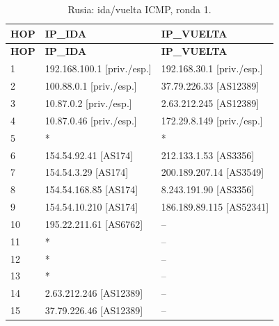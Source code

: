\begin{longtable}{p{0.95cm}p{7.075cm}p{7.075cm}}
\caption{Rusia: ida/vuelta ICMP, ronda 1.}\label{anexo:vuelta:37.79.226.46:ICMP:1} \\
\toprule
\textbf{HOP} & \textbf{IP\_\allowbreak{}IDA} & \textbf{IP\_\allowbreak{}VUELTA} \\ \midrule
\endfirsthead
\toprule
\textbf{HOP} & \textbf{IP\_\allowbreak{}IDA} & \textbf{IP\_\allowbreak{}VUELTA} \\ \midrule
\endhead
1 & 192.168.100.1 [priv./esp.] & 192.168.30.1 [priv./esp.] \\
2 & 100.88.0.1 [priv./esp.] & 37.79.226.33 [AS12389] \\
3 & 10.87.0.2 [priv./esp.] & 2.63.212.245 [AS12389] \\
4 & 10.87.0.46 [priv./esp.] & 172.29.8.149 [priv./esp.] \\
5 & * & * \\
6 & 154.54.92.41 [AS174] & 212.133.1.53 [AS3356] \\
7 & 154.54.3.29 [AS174] & 200.189.207.14 [AS3549] \\
8 & 154.54.168.85 [AS174] & 8.243.191.90 [AS3356] \\
9 & 154.54.10.210 [AS174] & 186.189.89.115 [AS52341] \\
10 & 195.22.211.61 [AS6762] & -- \\
11 & * & -- \\
12 & * & -- \\
13 & * & -- \\
14 & 2.63.212.246 [AS12389] & -- \\
15 & 37.79.226.46 [AS12389] & -- \\
\bottomrule
\end{longtable}
\endgroup
\begingroup
\fontsize{9}{11}\selectfont
